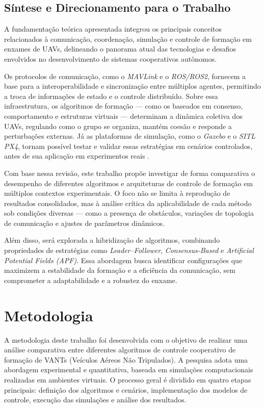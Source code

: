 \documentclass[portuguese]{sbcreviews-2025}%
\begin{document}
\subsection{Síntese e Direcionamento para o Trabalho}

A fundamentação teórica apresentada integrou os principais conceitos relacionados à comunicação, coordenação, simulação e controle de formação em enxames de UAVs, delineando o panorama atual das tecnologias e desafios envolvidos no desenvolvimento de sistemas cooperativos autônomos.

Os protocolos de comunicação, como o \textit{MAVLink} e o \textit{ROS/ROS2}, fornecem a base para a interoperabilidade e sincronização entre múltiplos agentes, permitindo a troca de informações de estado e o controle distribuído. Sobre essa infraestrutura, os algoritmos de formação — como os baseados em consenso, comportamento e estruturas virtuais — determinam a dinâmica coletiva dos UAVs, regulando como o grupo se organiza, mantém coesão e responde a perturbações externas. Já as plataformas de simulação, como o \textit{Gazebo} e o \textit{SITL PX4}, tornam possível testar e validar essas estratégias em cenários controlados, antes de sua aplicação em experimentos reais \cite{ouyang2023formation, bu2024advancement, khaliq2021}.

Com base nessa revisão, este trabalho propõe investigar de forma comparativa o desempenho de diferentes algoritmos e arquiteturas de controle de formação em múltiplos contextos experimentais. O foco não se limita à reprodução de resultados consolidados, mas à análise crítica da aplicabilidade de cada método sob condições diversas — como a presença de obstáculos, variações de topologia de comunicação e ajustes de parâmetros dinâmicos.

Além disso, será explorada a hibridização de algoritmos, combinando propriedades de estratégias como \textit{Leader–Follower}, \textit{Consensus-Based} e \textit{Artificial Potential Fields (APF)}. Essa abordagem busca identificar configurações que maximizem a estabilidade da formação e a eficiência da comunicação, sem comprometer a adaptabilidade e a robustez do enxame.

\section{Metodologia}

A metodologia deste trabalho foi desenvolvida com o objetivo de realizar uma análise comparativa entre diferentes algoritmos de controle cooperativo de formação de VANTs (Veículos Aéreos Não Tripulados). A pesquisa adota uma abordagem experimental e quantitativa, baseada em simulações computacionais realizadas em ambientes virtuais. O processo geral é dividido em quatro etapas principais: definição dos algoritmos e cenários, implementação dos modelos de controle, execução das simulações e análise dos resultados.
\end{document}
